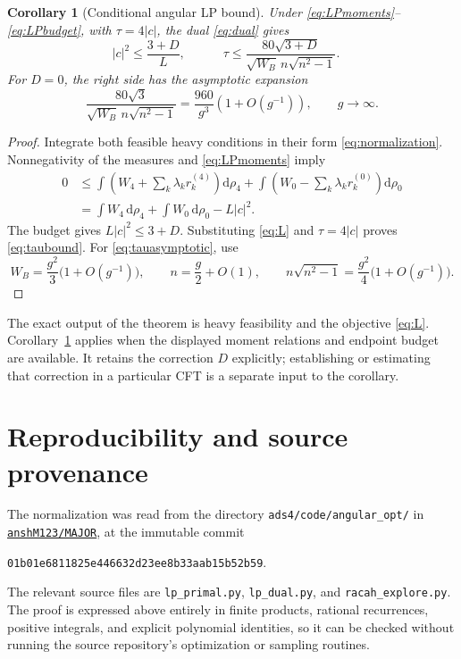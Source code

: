 \documentclass[11pt]{article}
\newtheorem{corollary}[theorem]{Corollary}
\theoremstyle{remark}
\numberwithin{equation}{section}
\newcommand{\WB}{W_B}
\newcommand{\dd}{\mathrm d}
\begin{document}
\begin{corollary}[Conditional angular LP bound]
\label{cor:LP}
Under \eqref{eq:LPmoments}--\eqref{eq:LPbudget}, with
$\tau=4|c|$, the dual \eqref{eq:dual} gives
\begin{equation}
 |c|^2\le\frac{3+D}{L},\qquad
 \boxed{\quad
 \tau\le\frac{80\sqrt{3+D}}{\sqrt{\WB}\,n\sqrt{n^2-1}}.
 \quad}
 \label{eq:taubound}
\end{equation}
For $D=0$, the right side has the asymptotic expansion
\begin{equation}
 \frac{80\sqrt3}{\sqrt{\WB}\,n\sqrt{n^2-1}}
 =\frac{960}{g^3}\left(1+O(g^{-1})\right),\qquad g\longrightarrow\infty.
 \label{eq:tauasymptotic}
\end{equation}
\end{corollary}

\begin{proof}
Integrate both feasible heavy conditions in their form
\eqref{eq:normalization}. Nonnegativity of the measures and
\eqref{eq:LPmoments} imply
\begin{align*}
 0
 &\le\int\left(W_4+\sum_k\lambda_kr_k^{(4)}\right)\dd\rho_4
   +\int\left(W_0-\sum_k\lambda_kr_k^{(0)}\right)\dd\rho_0\\
 &=\int W_4\,\dd\rho_4+\int W_0\,\dd\rho_0-L|c|^2.
\end{align*}
The budget gives $L|c|^2\le3+D$. Substituting \eqref{eq:L} and
$\tau=4|c|$ proves \eqref{eq:taubound}.
For \eqref{eq:tauasymptotic}, use
\[
 \WB=\frac{g^2}{3}\bigl(1+O(g^{-1})\bigr),\qquad
 n=\frac g2+O(1),\qquad n\sqrt{n^2-1}=\frac{g^2}{4}\bigl(1+O(g^{-1})\bigr).
\]
\end{proof}

The exact output of the theorem is heavy feasibility and the objective
\eqref{eq:L}. Corollary~\ref{cor:LP} applies when the displayed moment
relations and endpoint budget are available. It retains the correction
$D$ explicitly; establishing or estimating that correction in a particular
CFT is a separate input to the corollary.

\section{Reproducibility and source provenance}
\label{sec:reproducibility}

The normalization was read from the directory
\texttt{ads4/code/angular\_opt/} in
\href{https://github.com/anshM123/MAJOR}{\texttt{anshM123/MAJOR}}, at the
immutable commit
\begin{center}
\texttt{01b01e6811825e446632d23ee8b33aab15b52b59}.
\end{center}
The relevant source files are \texttt{lp\_primal.py},
\texttt{lp\_dual.py}, and \texttt{racah\_explore.py}. The proof is
expressed above entirely in finite products, rational recurrences, positive
integrals, and explicit polynomial identities, so it can be checked without
running the source repository's optimization or sampling routines.
\end{document}

